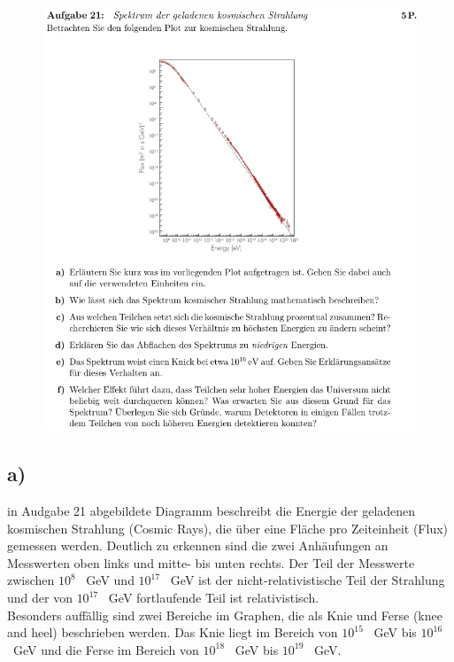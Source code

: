     \begin{figure}[H]
        \centering
        \includegraphics[width=\textwidth]{images/Aufgabe21.jpg}
        \label{fig:4}
    \end{figure}


\subsection{a)}

    \justifying in Audgabe 21 abgebildete Diagramm beschreibt die Energie der geladenen kosmischen Strahlung (Cosmic Rays), die über eine Fläche pro Zeiteinheit (Flux)
    gemessen werden. Deutlich zu erkennen sind die zwei Anhäufungen an Messwerten oben links und mitte- bis unten rechts. Der Teil der Messwerte zwischen $10^{8}$ \SI{}{\giga\electronvolt}
    und $10^{17}$ \SI{}{\giga\electronvolt} ist der nicht-relativistische Teil der Strahlung und der von $10^{17}$ \SI{}{\giga\electronvolt} fortlaufende Teil ist relativistisch.\\
    Besonders auffällig sind zwei Bereiche im Graphen, die als Knie und Ferse (knee and heel) beschrieben werden. Das Knie liegt im Bereich von $10^{15}$ \SI{}{\giga\electronvolt}
    bis $10^{16}$ \SI{}{\giga\electronvolt} und die Ferse im Bereich von $10^{18}$ \SI{}{\giga\electronvolt} bis $10^{19}$ \SI{}{\giga\electronvolt}.

